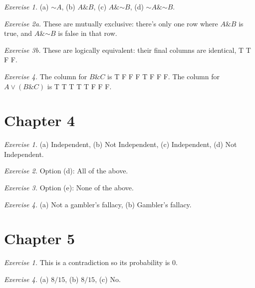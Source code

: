 \documentclass[justified]{tufte-book}
\renewcommand{\neg}{\mathbin{\sim}}
\renewcommand{\wedge}{\mathbin{\&}}
\begin{document}
\noindent
\emph{Exercise 1.} (a) \(\neg A\), (b) \(A \wedge B\), (c) \(A \wedge \neg B\), (d) \(\neg A \wedge \neg B\).

\vspace{.5em}

\noindent
\emph{Exercise 2a.} These are mutually exclusive: there's only one row where \(A \wedge B\) is true, and \(A \wedge \neg B\) is false in that row.

\vspace{.5em}

\noindent
\emph{Exercise 3b.} These are logically equivalent: their final columns are identical, T T F F.

\vspace{.5em}

\noindent
\emph{Exercise 4.} The column for \(B \wedge C\) is T F F F T F F F. The column for \(A \vee (B \wedge C)\) is T T T T T F F F.

\hypertarget{chapter-4}{%
\section*{Chapter 4}\label{chapter-4}}

\noindent
\emph{Exercise 1.} (a) Independent, (b) Not Independent, (c) Independent, (d) Not Independent.

\vspace{.5em}

\noindent
\emph{Exercise 2.} Option (d): All of the above.

\vspace{.5em}

\noindent
\emph{Exercise 3.} Option (e): None of the above.

\vspace{.5em}

\noindent
\emph{Exercise 4.} (a) Not a gambler's fallacy, (b) Gambler's fallacy.

\hypertarget{chapter-5}{%
\section*{Chapter 5}\label{chapter-5}}

\noindent
\emph{Exercise 1.} This is a contradiction so its probability is \(0\).

\vspace{.5em}

\noindent
\emph{Exercise 4.} (a) \(8/15\), (b) \(8/15\), (c) No.
\end{document}
